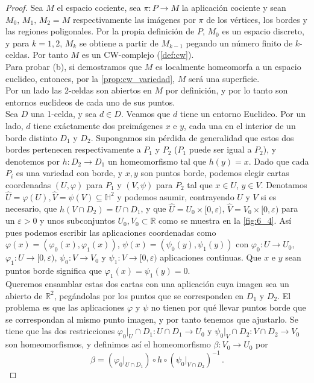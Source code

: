 \documentclass[10pt]{report}
\newcommand{\R}{\mathbb{R}}
\theoremstyle{definition}
\begin{document}
\begin{proof} 
Sea $M$ el espacio cociente, sea $\pi :P\to M$ la aplicación cociente y sean $M_0, \, M_1, \, M_2=M$ respectivamente las imágenes por $\pi$ de los vértices, los bordes y las regiones poligonales. Por la propia definición de $P$, $M_0$ es un espacio discreto, y para $k=1,2$, $M_k$ se obtiene a partir de $M_{k-1}$ pegando un número finito de $k$-celdas. Por tanto $M$ es un CW-complejo (\autoref{def:cw}).\\
Para probar (b), si demostramos que $M$ es localmente homeomorfa a un espacio euclideo, entonces, por la \autoref{prop:cw_variedad}, $M$ será una superficie.\\
Por un lado las 2-celdas son abiertos en $M$ por definición, y por lo tanto son entornos euclideos de cada uno de sus puntos.\\
Sea $D$ una 1-celda, y sea $d\in D$. Veamos que $d$ tiene un entorno Euclideo. Por un lado, $d$ tiene exáctamente dos preimágenes $x$ e $y$, cada una en el interior de un borde distinto $D_1$ y $D_2$. Supongamos sin pérdida de generalidad que estos dos bordes pertenecen respectivamente a $P_1$ y $P_2$ ($P_1$ puede ser igual a $P_2$), y denotemos por $h:D_2\to D_1$ un homeomorfismo tal que $h(y)=x$. Dado que cada $P_i$ es una variedad con borde, y $x,y$ son puntos borde, podemos elegir cartas coordenadas $(U,\varphi)$  para $P_1$ y $(V,\psi)$ para $P_2$ tal que $x\in U$, $y\in V$. Denotamos $\widehat{U}=\varphi(U),\widehat{V}=\psi(V)\subseteq \mathbb{H}^2$ y podemos asumir, contrayendo $U$ y $V$ si es necesario, que $h(V\cap D_2)=U\cap D_1$, y que $\widehat{U}=U_0\times [0,\varepsilon)$, $\widehat{V}=V_0\times [0,\varepsilon)$  para un $\varepsilon >0$ y unos subconjuntos $U_0, V_0 \subset \R$ como se muestra en la \autoref{fig:6_4}. Así pues podemos escribir las aplicaciones coordenadas como $\varphi(x)=(\varphi_0(x),\varphi_1(x))$, $\psi(x)=(\psi_0(y),\psi_1(y))$ con $\varphi_0:U\to U_0$, $\varphi_1:U\to [0,\varepsilon)$, $\psi_0:V\to V_0$ y $\psi_1:V\to [0,\varepsilon)$ aplicaciones continuas. Que $x$ e $y$ sean puntos borde significa que $\varphi_1(x)=\psi_1(y)=0$.\\
Queremos ensamblar estas dos cartas con una aplicación cuya imagen sea un abierto de $\R^2$, pegándolas por los puntos que se corresponden en $D_1$ y $D_2$. El problema es que las aplicaciones $\varphi$ y $\psi$ no tienen por qué llevar puntos borde que se correspondan al mismo punto imagen, y por tanto tenemos que ajustarlo. Se tiene que las dos restricciones $\varphi_0|_U\cap D_1: U\cap D_1\to U_0$ y $\psi_0|_V\cap D_2:V\cap D_2\to V_0$ son homeomorfismos, y definimos así el homeomorfismo $\beta:V_0\to U_0$ por $$\beta=(\varphi_0|_{U\cap D_1})\circ h\circ (\psi_0|_{V\cap D_2})^{-1}\, .$$ 

\end{proof}
\end{document}
